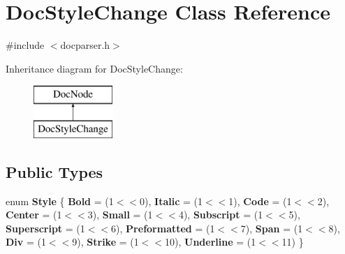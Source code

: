\hypertarget{class_doc_style_change}{}\section{Doc\+Style\+Change Class Reference}
\label{class_doc_style_change}


{\ttfamily \#include $<$docparser.\+h$>$}

Inheritance diagram for Doc\+Style\+Change\+:\begin{figure}[H]
\begin{center}
\leavevmode
\includegraphics[height=2.000000cm]{class_doc_style_change}
\end{center}
\end{figure}
\subsection*{Public Types}
\begin{DoxyCompactItemize}
\item 
\mbox{\label{class_doc_style_change_a97757d2d85c39228c90693491a56d277}} 
enum {\bfseries Style} \{ \newline
{\bfseries Bold} = (1$<$$<$0), 
{\bfseries Italic} = (1$<$$<$1), 
{\bfseries Code} = (1$<$$<$2), 
{\bfseries Center} = (1$<$$<$3), 
\newline
{\bfseries Small} = (1$<$$<$4), 
{\bfseries Subscript} = (1$<$$<$5), 
{\bfseries Superscript} = (1$<$$<$6), 
{\bfseries Preformatted} = (1$<$$<$7), 
\newline
{\bfseries Span} = (1$<$$<$8), 
{\bfseries Div} = (1$<$$<$9), 
{\bfseries Strike} = (1$<$$<$10), 
{\bfseries Underline} = (1$<$$<$11)
 \}
\end{DoxyCompactItemize}
